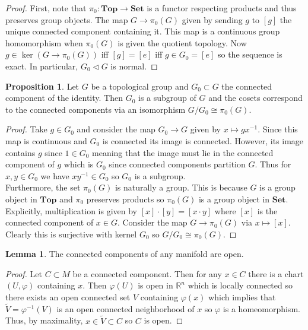 \documentclass[12pt]{article}
\newcommand{\R}{\mathbb{R}}
\newcommand{\Top}{\mathbf{Top}}
\newcommand{\Set}{\mathbf{Set}}
\theoremstyle{remark}
\theoremstyle{definition}
\newtheorem{lemma}[theorem]{Lemma}
\newtheorem{proposition}[theorem]{Proposition}
\begin{document}
\begin{proof}
First, note that $\pi_0 : \mathbf{Top} \to \mathbf{Set}$ is a functor respecting products and thus preserves group objects. The map $G \to \pi_0(G)$ given by sending $g$ to $[g]$ the unique connected component containing it. This map is a continuous group homomorphism when $\pi_0(G)$ is given the quotient topology. 
Now $g \in \ker{(G \to \pi_0(G))}$ iff $[g] = [e]$ iff $g \in G_0 = [e]$ so the sequence is exact. In particular, $G_0 \triangleleft G$ is normal.
\end{proof}

\begin{proposition}
Let $G$ be a topological group and $G_0 \subset G$ the connected component of the identity. Then $G_0$ is a subgroup of $G$ and the cosets correspond to the connected components via an isomorphism $G / G_0 \cong \pi_0(G)$.
\end{proposition}

\begin{proof}
Take $g \in G_0$ and consider the map $G_0 \to G$ given by $x \mapsto gx^{-1}$. Since this map is continuous and $G_0$ is connected its image is connected. However, its image contains $g$ since $1 \in G_0$ meaning that the image must lie in the connected component of $g$ which is $G_0$ since connected components partition $G$. Thus for $x,y \in G_0$ we have $xy^{-1} \in G_0$ so $G_0$ is a subgroup. 
\bigskip\\
Furthermore, the set $\pi_0(G)$ is naturally a group. This is because $G$ is a group object in $\Top$ and $\pi_0$ preserves products so $\pi_0(G)$ is a group object in $\Set$. Explicitly, multiplication is given by $[x] \cdot [y] = [x \cdot y]$ where $[x]$ is the connected component of $x \in G$. Consider the map $G \to \pi_0(G)$ via $x \mapsto [x]$. Clearly this is surjective with kernel $G_0$ so $G / G_0 \cong \pi_0(G)$.
\end{proof}

\begin{lemma}
The connected components of any manifold are open. 
\end{lemma}

\begin{proof}
Let $C \subset M$ be a connected component. Then for any $x \in C$ there is a chart $(U, \varphi)$ containing $x$. Then $\varphi(U)$ is open in $\R^n$ which is locally connected so there exists an open connected set $V$ containing $\varphi(x)$ which implies that $\tilde{V} = \varphi^{-1}(V)$ is an open connected neighborhood of $x$ so $\varphi$ is a homeomorphism. Thus, by maximality, $x\in \tilde{V} \subset C$ so $C$ is open.
\end{proof}
\end{document}
